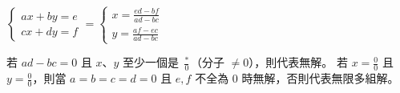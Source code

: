 $\begin{cases}ax+by=e\\cx+dy=f\end{cases} = \begin{cases}x = \frac{ed-bf}{ad-bc}\\y = \frac{af-ec}{ad-bc}\end{cases}$

若 $ad-bc=0$ 且 $x$、$y$ 至少一個是 $\frac{*}{0}$（分子 $\neq 0$），則代表無解。
若 $x = \frac{0}{0}$ 且 $y = \frac{0}{0}$，則當 $a=b=c=d=0$ 且 $e, f$ 不全為 $0$ 時無解，否則代表無限多組解。
